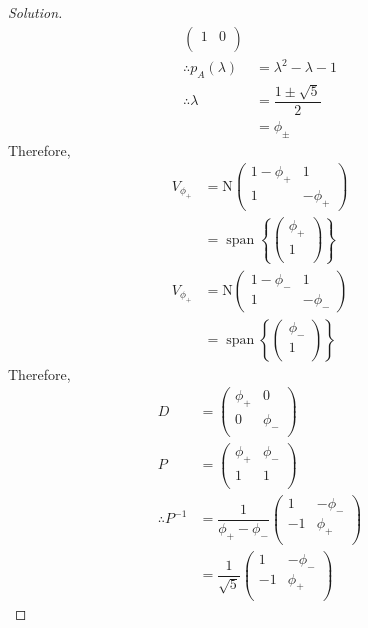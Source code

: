 \documentclass[fleqn, a4paper, 12pt]{article}
\newcommand{\N}{\mathrm{N}}
\theoremstyle{definition}
\theoremstyle{theorem}
\newenvironment{solution}
{\begin{proof}[Solution]\let\qed\relax}
	{\end{proof}}
\DeclareMathOperator{\vspan}{\mathrm{span}} %
\begin{document}
\begin{solution}
\begin{align*}
\begin{pmatrix}
				1 & 0\\
			\end{pmatrix}\\
		\therefore p_A(\lambda) &= \lambda^2 - \lambda - 1\\
		\therefore \lambda &= \dfrac{1 \pm \sqrt{5}}{2}\\
		&= \phi_{\pm}
	\end{align*}
	Therefore,
	\begin{align*}
		V_{\phi_{+}} &= \N
			\begin{pmatrix}
				1 - \phi_{+} & 1\\
				1 & - \phi_{+}
			\end{pmatrix}\\
		&= \vspan
			\left\{
				\begin{pmatrix}
					\phi_{+}\\
					1\\
				\end{pmatrix}
			\right\}\\
		V_{\phi_{+}} &= \N
			\begin{pmatrix}
				1 - \phi_{-} & 1\\
				1 & - \phi_{-}
			\end{pmatrix}\\
		&= \vspan
			\left\{
				\begin{pmatrix}
					\phi_{-}\\
					1\\
				\end{pmatrix}
			\right\}
	\end{align*}
	Therefore,
	\begin{align*}
		D &= 
			\begin{pmatrix}
				\phi_{+} & 0\\
				0 & \phi_{-}\\
			\end{pmatrix}\\
		P &= 
			\begin{pmatrix}
				\phi_{+} & \phi_{-}\\
				1 & 1\\
			\end{pmatrix}\\
		\therefore P^{-1} &= \dfrac{1}{\phi_{+} - \phi_{-}}
			\begin{pmatrix}
				1 & -\phi_{-}\\
				-1 & \phi_{+}\\
			\end{pmatrix}\\
		&= \dfrac{1}{\sqrt{5}}
			\begin{pmatrix}
				1 & -\phi_{-}\\
				-1 & \phi_{+}\\
			\end{pmatrix}
	\end{align*}
	

\end{solution}
\end{document}
